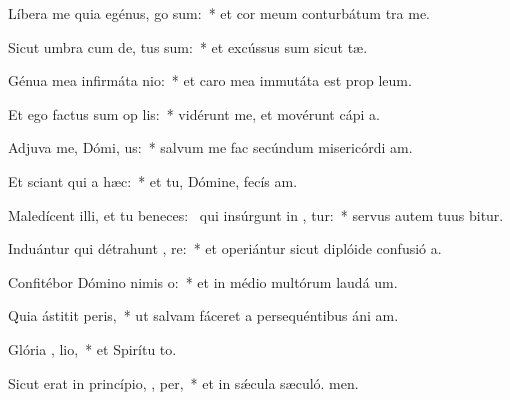 \item Líbera me quia egénus,   go sum:~* et cor meum conturbátum  tra me.
\item Sicut umbra cum de, tus sum:~* et excússus sum sicut tæ.
\item Génua mea infirmáta   nio:~* et caro mea immutáta est prop leum.
\item Et ego factus sum op lis:~* vidérunt me, et movérunt cápi a.
\item Adjuva me, Dómi,  us:~* salvum me fac secúndum misericórdi am.
\item Et sciant qui  a hæc:~* et tu, Dómine, fecís am.
\item Maledícent illi, et tu beneces:~\pscross{} qui insúrgunt in , tur:~* servus autem tuus bitur.
\item Induántur qui détrahunt , re:~* et operiántur sicut diplóide confusió a.
\item Confitébor Dómino nimis   o:~* et in médio multórum laudá um.
\item Quia ástitit   peris,~* ut salvam fáceret a persequéntibus áni am.
\item Glória ,  lio,~* et Spirítu to.
\item Sicut erat in princípio,  ,  per,~* et in sǽcula sæculó. men.
